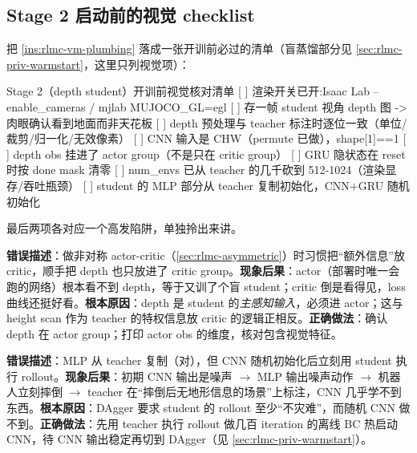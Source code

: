 \subsection{Stage 2 启动前的视觉 checklist}
\label{sec:rlmc-vm-checklist}

把 \cref{ins:rlmc-vm-plumbing} 落成一张开训前必过的清单（盲蒸馏部分见 \cref{sec:rlmc-priv-warmstart}，这里只列视觉项）：

\begin{codebox}{Stage 2（depth student）开训前视觉核对清单}
[ ] 渲染开关已开:Isaac Lab --enable_cameras / mjlab MUJOCO_GL=egl
[ ] 存一帧 student 视角 depth 图 -> 肉眼确认看到地面而非天花板
[ ] depth 预处理与 teacher 标注时逐位一致（单位/裁剪/归一化/无效像素）
[ ] CNN 输入是 CHW（permute 已做），shape[1]==1
[ ] depth obs 挂进了 actor group（不是只在 critic group）
[ ] GRU 隐状态在 reset 时按 done mask 清零
[ ] num_envs 已从 teacher 的几千砍到 512-1024（渲染显存/吞吐瓶颈）
[ ] student 的 MLP 部分从 teacher 复制初始化，CNN+GRU 随机初始化
\end{codebox}

最后两项各对应一个高发陷阱，单独拎出来讲。

\begin{pitfall}
\textbf{错误描述}：做非对称 actor-critic（\cref{sec:rlmc-asymmetric}）时习惯把“额外信息”放 critic，顺手把 depth 也只放进了 critic group。\textbf{现象后果}：actor（部署时唯一会跑的网络）根本看不到 depth，等于又训了个盲 student；critic 倒是看得见，loss 曲线还挺好看。\textbf{根本原因}：depth 是 student 的\emph{主感知输入}，必须进 actor；这与 height scan 作为 teacher 的特权信息放 critic 的逻辑正相反。\textbf{正确做法}：确认 depth 在 actor group；打印 actor obs 的维度，核对包含视觉特征。
\end{pitfall}

\begin{pitfall}
\textbf{错误描述}：MLP 从 teacher 复制（对），但 CNN 随机初始化后立刻用 student 执行 rollout。\textbf{现象后果}：初期 CNN 输出是噪声 $\to$ MLP 输出噪声动作 $\to$ 机器人立刻摔倒 $\to$ teacher 在“摔倒后无地形信息的场景”上标注，CNN 几乎学不到东西。\textbf{根本原因}：DAgger 要求 student 的 rollout 至少“不灾难”，而随机 CNN 做不到。\textbf{正确做法}：先用 teacher 执行 rollout 做几百 iteration 的离线 BC 热启动 CNN，待 CNN 输出稳定再切到 DAgger（见 \cref{sec:rlmc-priv-warmstart}）。
\end{pitfall}

